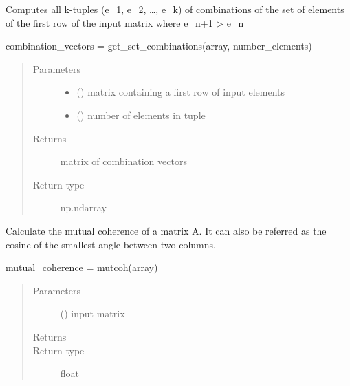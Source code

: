 \documentclass[letterpaper,10pt,english,openany,oneside]{sphinxmanual}
\begin{document}
\begin{fulllineitems}
\label{\detokenize{pygpc:pygpc.misc.get_set_combinations}}
Computes all k-tuples (e\_1, e\_2, …, e\_k) of combinations of the set of elements of the first row of the
input matrix where e\_n+1 \textgreater{} e\_n

combination\_vectors = get\_set\_combinations(array, number\_elements)
\begin{quote}\begin{description}
\item[{Parameters}] \leavevmode\begin{itemize}
\item {} 
 () \textendash{} matrix containing a first row of input elements

\item {} 
 () \textendash{} number of elements in tuple

\end{itemize}

\item[{Returns}] \leavevmode
{} \textendash{} matrix of combination vectors

\item[{Return type}] \leavevmode
np.ndarray

\end{description}\end{quote}

\end{fulllineitems}


\begin{fulllineitems}
\label{\detokenize{pygpc:pygpc.misc.mutcoh}}
Calculate the mutual coherence of a matrix A. It can also be referred as the cosine
of the smallest angle between two columns.

mutual\_coherence = mutcoh(array)
\begin{quote}\begin{description}
\item[{Parameters}] \leavevmode
{} () \textendash{} input matrix

\item[{Returns}] \leavevmode
{}

\item[{Return type}] \leavevmode
float

\end{description}\end{quote}

\end{fulllineitems}
\end{document}
